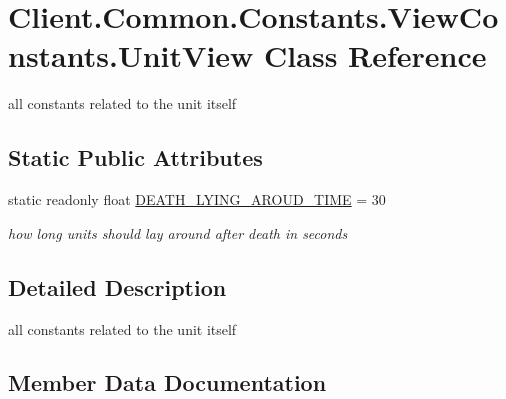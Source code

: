 \hypertarget{classClient_1_1Common_1_1Constants_1_1ViewConstants_1_1UnitView}{}\section{Client.\+Common.\+Constants.\+View\+Constants.\+Unit\+View Class Reference}
\label{classClient_1_1Common_1_1Constants_1_1ViewConstants_1_1UnitView}


all constants related to the unit itself  


\subsection*{Static Public Attributes}
\begin{DoxyCompactItemize}
\item 
static readonly float \hyperlink{classClient_1_1Common_1_1Constants_1_1ViewConstants_1_1UnitView_a239dbd2215b5a4fab82106153c295f52}{D\+E\+A\+T\+H\+\_\+\+L\+Y\+I\+N\+G\+\_\+\+A\+R\+O\+U\+D\+\_\+\+T\+I\+M\+E} = 30
\begin{DoxyCompactList}\small\item\em how long units should lay around after death in seconds \end{DoxyCompactList}\end{DoxyCompactItemize}


\subsection{Detailed Description}
all constants related to the unit itself 



\subsection{Member Data Documentation}
\hypertarget{classClient_1_1Common_1_1Constants_1_1ViewConstants_1_1UnitView_a239dbd2215b5a4fab82106153c295f52}{}
